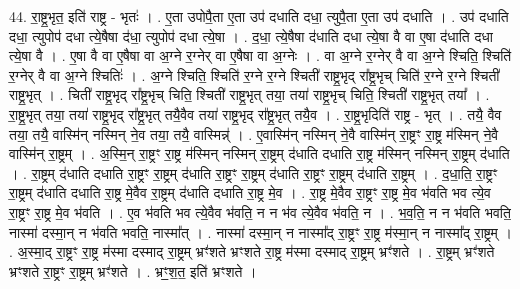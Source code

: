 \documentclass[17pt]{extarticle}
\begin{document}
44. रा॒ष्ट्र॒भृत॒ इति॑ राष्ट्र - भृतः॑ । . ए॒ता उपोपै॒ता ए॒ता उप॑ दधाति दधा॒ त्युपै॒ता ए॒ता उप॑ दधाति । . उप॑ दधाति दधा॒ त्युपोप॑ दधा त्ये॒षैषा द॑धा॒ त्युपोप॑ दधा त्ये॒षा । . द॒धा॒ त्ये॒षैषा द॑धाति दधा त्ये॒षा वै वा ए॒षा द॑धाति दधा त्ये॒षा वै । . ए॒षा वै वा ए॒षैषा वा अ॒ग्ने र॒ग्नेर् वा ए॒षैषा वा अ॒ग्नेः । . वा अ॒ग्ने र॒ग्नेर् वै वा अ॒ग्ने श्चिति॒ श्चिति॑ र॒ग्नेर् वै वा अ॒ग्ने श्चितिः॑ । . अ॒ग्ने श्चिति॒ श्चिति॑ र॒ग्ने र॒ग्ने श्चिती॑ राष्ट्र॒भृद् रा᳚ष्ट्र॒भृच् चिति॑ र॒ग्ने र॒ग्ने श्चिती॑ राष्ट्र॒भृत् । . चिती॑ राष्ट्र॒भृद् रा᳚ष्ट्र॒भृच् चिति॒ श्चिती॑ राष्ट्र॒भृत् तया॒ तया॑ राष्ट्र॒भृच् चिति॒ श्चिती॑ राष्ट्र॒भृत् तया᳚ । . रा॒ष्ट्र॒भृत् तया॒ तया॑ राष्ट्र॒भृद् रा᳚ष्ट्र॒भृत् तयै॒वैव तया॑ राष्ट्र॒भृद् रा᳚ष्ट्र॒भृत् तयै॒व । . रा॒ष्ट्र॒भृदिति॑ राष्ट्र - भृत् । . तयै॒ वैव तया॒ तयै॒ वास्मि॑न् नस्मिन् ने॒व तया॒ तयै॒ वास्मिन्न्॑ । . ए॒वास्मि॑न् नस्मिन् ने॒वै वास्मि॑न् रा॒ष्ट्रꣳ रा॒ष्ट्र म॑स्मिन् ने॒वै वास्मि॑न् रा॒ष्ट्रम् । . अ॒स्मि॒न् रा॒ष्ट्रꣳ रा॒ष्ट्र म॑स्मिन् नस्मिन् रा॒ष्ट्रम् द॑धाति दधाति रा॒ष्ट्र म॑स्मिन् नस्मिन् रा॒ष्ट्रम् द॑धाति । . रा॒ष्ट्रम् द॑धाति दधाति रा॒ष्ट्रꣳ रा॒ष्ट्रम् द॑धाति रा॒ष्ट्रꣳ रा॒ष्ट्रम् द॑धाति रा॒ष्ट्रꣳ रा॒ष्ट्रम् द॑धाति रा॒ष्ट्रम् । . द॒धा॒ति॒ रा॒ष्ट्रꣳ रा॒ष्ट्रम् द॑धाति दधाति रा॒ष्ट्र मे॒वैव रा॒ष्ट्रम् द॑धाति दधाति रा॒ष्ट्र मे॒व । . रा॒ष्ट्र मे॒वैव रा॒ष्ट्रꣳ रा॒ष्ट्र मे॒व भ॑वति भव त्ये॒व रा॒ष्ट्रꣳ रा॒ष्ट्र मे॒व भ॑वति । . ए॒व भ॑वति भव त्ये॒वैव भ॑वति॒ न न भ॑व त्ये॒वैव भ॑वति॒ न । . भ॒व॒ति॒ न न भ॑वति भवति॒ नास्मा॑ दस्मा॒न् न भ॑वति भवति॒ नास्मा᳚त् । . नास्मा॑ दस्मा॒न् न नास्मा᳚द् रा॒ष्ट्रꣳ रा॒ष्ट्र म॑स्मा॒न् न नास्मा᳚द् रा॒ष्ट्रम् । . अ॒स्मा॒द् रा॒ष्ट्रꣳ रा॒ष्ट्र म॑स्मा दस्माद् रा॒ष्ट्रम् भ्रꣳ॑शते भ्रꣳशते रा॒ष्ट्र म॑स्मा दस्माद् रा॒ष्ट्रम् भ्रꣳ॑शते । . रा॒ष्ट्रम् भ्रꣳ॑शते भ्रꣳशते रा॒ष्ट्रꣳ रा॒ष्ट्रम् भ्रꣳ॑शते । . भ्रꣳ॒॒श॒त॒ इति॑ भ्रꣳशते । \newline
\pagebreak
{}
\end{document}
